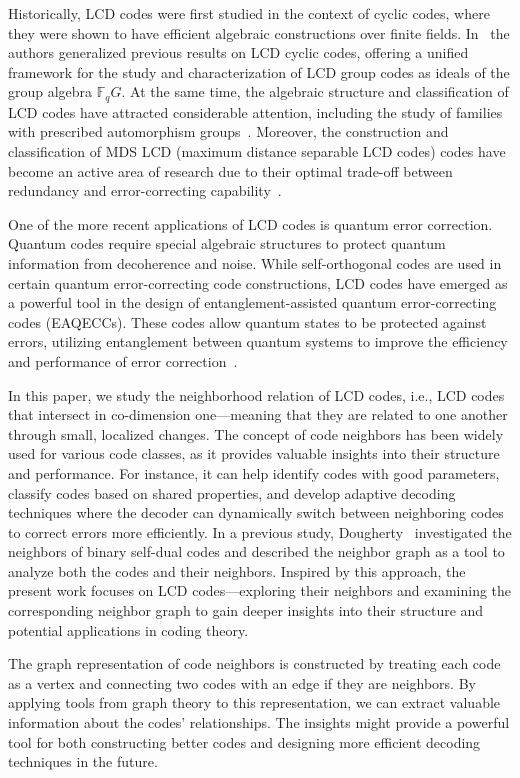 \documentclass[11pt]{article}
\theoremstyle{definition}
\newcommand{\F}{\mathbb{F}}
\begin{document}
Historically, LCD codes were first studied in the context of cyclic codes, where they were shown to have efficient algebraic constructions over finite fields.
In~\cite{dlCW18} the authors generalized previous results on LCD cyclic codes, offering a unified framework for the study and characterization of LCD group codes as ideals of the group algebra $\F_q G$.
At the same time, the algebraic structure and classification of LCD codes have attracted considerable attention, including the study of families with prescribed automorphism groups~\cite{BouyuklievaDeLaCruz2022}.
Moreover, the construction and classification of MDS LCD (maximum distance separable LCD codes) codes have become an active area of research due to their optimal trade-off between redundancy and error-correcting capability~\cite{8319441,9447685}.

One of the more recent applications of LCD codes is quantum error correction.
Quantum codes require special algebraic structures to protect quantum information from decoherence and noise.
While self-orthogonal codes are used in certain quantum error-correcting code constructions, LCD codes have emerged as a powerful tool in the design of entanglement-assisted quantum error-correcting codes (EAQECCs).
These codes allow quantum states to be protected against errors, utilizing entanglement between quantum systems to improve the efficiency and performance of error correction~\cite{Ren2023, Guenda2018EAQECC,Liu2019}.

In this paper, we study the neighborhood relation of LCD codes, i.e., LCD codes that intersect in co-dimension one---meaning that they are related to one another through small, localized changes.
The concept of code neighbors has been widely used for various code classes, as it provides valuable insights into their structure and performance.
For instance, it can help identify codes with good parameters, classify codes based on shared properties, and develop adaptive decoding techniques where the decoder can dynamically switch between neighboring codes to correct errors more efficiently.
In a previous study, Dougherty~\cite{Dou22} investigated the neighbors of binary self-dual codes and described the neighbor graph as a tool to analyze both the codes and their neighbors.
Inspired by this approach, the present work focuses on LCD codes---exploring their neighbors and examining the corresponding neighbor graph to gain deeper insights into their structure and potential applications in coding theory.

The graph representation of code neighbors is constructed by treating each code as a vertex and connecting two codes with an edge if they are neighbors.
By applying tools from graph theory to this representation, we can extract valuable information about the codes' relationships.
The insights might provide a powerful tool for both constructing better codes and designing more efficient decoding techniques in the future.
\end{document}
